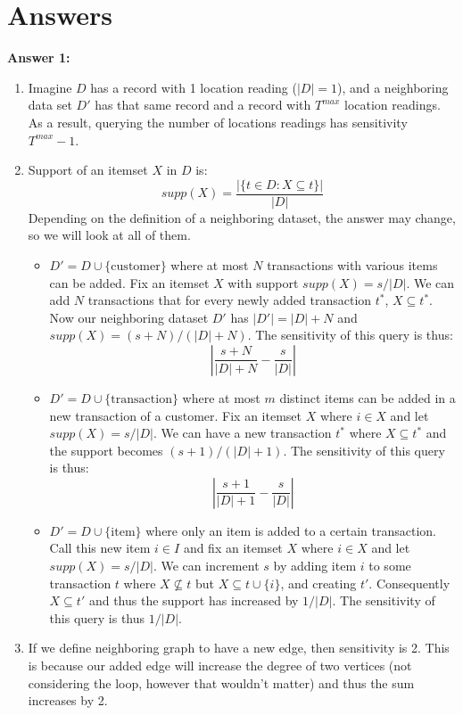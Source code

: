 \documentclass[12pt,reqno]{amsart}
\begin{document}
\section*{Answers}
\textbf{Answer 1:} 
\begin{enumerate}[label=(\alph*)]
\item Imagine $D$ has a record with 1 location reading ($|D|=1$), and a neighboring data set $D'$ has that same record and a record with $T^{max}$ location readings. As a result, querying the number of locations readings has sensitivity $T^{max} - 1$.
\item Support of an itemset $X$ in $D$ is:
$$
supp(X) = \frac{|\{t \in D : X \subseteq t\}|}{|D|}
$$
Depending on the definition of a neighboring dataset, the answer may change, so we will look at all of them.
\begin{itemize}
	\item $D' = D \cup \{\textrm{customer}\}$ where at most $N$ transactions with various items can be added. Fix an itemset $X$ with support $supp(X) = s/|D|$. We can add $N$ transactions that for every newly added transaction $t^*$, $X \subseteq t^*$. Now our neighboring dataset $D'$ has $|D'|=|D|+N$ and $supp(X)=(s+N)/(|D|+N)$. The sensitivity of this query is thus:
	$$
	\left|\frac{s+N}{|D|+N}-\frac{s}{|D|}\right|
	$$
	\item $D' = D \cup \{\textrm{transaction}\}$ where at most $m$ distinct items can be added in a new transaction of a customer. Fix an itemset $X$ where $i \in X$ and let $supp(X)=s/|D|$. We can have a new transaction $t^*$ where $X \subseteq t^*$ and the support becomes $(s+1)/(|D|+1)$. The sensitivity of this query is thus:
	$$
	\left|\frac{s+1}{|D|+1}-\frac{s}{|D|}\right|
	$$
	\item $D' = D \cup \{\textrm{item}\}$ where only an item is added to a certain transaction. Call this new item $i \in I$ and fix an itemset $X$ where $i \in X$ and let $supp(X)=s/|D|$. We can increment $s$ by adding item $i$ to some transaction $t$ where $X \not\subseteq t$ but $X \subseteq t \cup \{i\}$, and creating $t'$. Consequently $X \subseteq t'$ and thus the support has increased by $1/|D|$. The sensitivity of this query is thus $1/|D|$.
\end{itemize}
\item If we define neighboring graph to have a new edge, then sensitivity is 2. This is because our added edge will increase the degree of two vertices (not considering the loop, however that wouldn't matter) and thus the sum increases by 2.


\end{enumerate}
\end{document}
